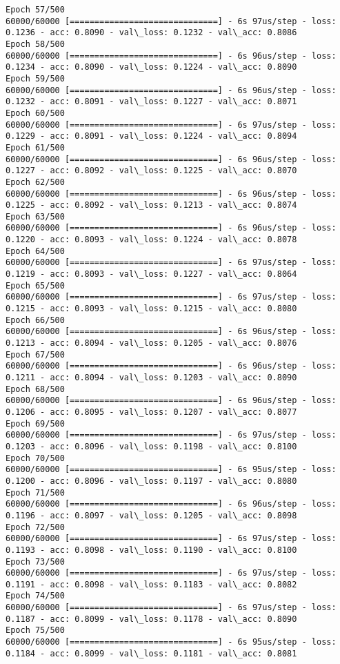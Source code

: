 \documentclass[11pt]{article}
\begin{document}
\begin{Verbatim}[commandchars=\\\{\}]
Epoch 57/500
60000/60000 [==============================] - 6s 97us/step - loss: 0.1236 - acc: 0.8090 - val\_loss: 0.1232 - val\_acc: 0.8086
Epoch 58/500
60000/60000 [==============================] - 6s 96us/step - loss: 0.1234 - acc: 0.8090 - val\_loss: 0.1224 - val\_acc: 0.8090
Epoch 59/500
60000/60000 [==============================] - 6s 96us/step - loss: 0.1232 - acc: 0.8091 - val\_loss: 0.1227 - val\_acc: 0.8071
Epoch 60/500
60000/60000 [==============================] - 6s 97us/step - loss: 0.1229 - acc: 0.8091 - val\_loss: 0.1224 - val\_acc: 0.8094
Epoch 61/500
60000/60000 [==============================] - 6s 96us/step - loss: 0.1227 - acc: 0.8092 - val\_loss: 0.1225 - val\_acc: 0.8070
Epoch 62/500
60000/60000 [==============================] - 6s 96us/step - loss: 0.1225 - acc: 0.8092 - val\_loss: 0.1213 - val\_acc: 0.8074
Epoch 63/500
60000/60000 [==============================] - 6s 96us/step - loss: 0.1220 - acc: 0.8093 - val\_loss: 0.1224 - val\_acc: 0.8078
Epoch 64/500
60000/60000 [==============================] - 6s 97us/step - loss: 0.1219 - acc: 0.8093 - val\_loss: 0.1227 - val\_acc: 0.8064
Epoch 65/500
60000/60000 [==============================] - 6s 97us/step - loss: 0.1215 - acc: 0.8093 - val\_loss: 0.1215 - val\_acc: 0.8080
Epoch 66/500
60000/60000 [==============================] - 6s 96us/step - loss: 0.1213 - acc: 0.8094 - val\_loss: 0.1205 - val\_acc: 0.8076
Epoch 67/500
60000/60000 [==============================] - 6s 96us/step - loss: 0.1211 - acc: 0.8094 - val\_loss: 0.1203 - val\_acc: 0.8090
Epoch 68/500
60000/60000 [==============================] - 6s 96us/step - loss: 0.1206 - acc: 0.8095 - val\_loss: 0.1207 - val\_acc: 0.8077
Epoch 69/500
60000/60000 [==============================] - 6s 97us/step - loss: 0.1203 - acc: 0.8096 - val\_loss: 0.1198 - val\_acc: 0.8100
Epoch 70/500
60000/60000 [==============================] - 6s 95us/step - loss: 0.1200 - acc: 0.8096 - val\_loss: 0.1197 - val\_acc: 0.8080
Epoch 71/500
60000/60000 [==============================] - 6s 96us/step - loss: 0.1196 - acc: 0.8097 - val\_loss: 0.1205 - val\_acc: 0.8098
Epoch 72/500
60000/60000 [==============================] - 6s 97us/step - loss: 0.1193 - acc: 0.8098 - val\_loss: 0.1190 - val\_acc: 0.8100
Epoch 73/500
60000/60000 [==============================] - 6s 97us/step - loss: 0.1191 - acc: 0.8098 - val\_loss: 0.1183 - val\_acc: 0.8082
Epoch 74/500
60000/60000 [==============================] - 6s 97us/step - loss: 0.1187 - acc: 0.8099 - val\_loss: 0.1178 - val\_acc: 0.8090
Epoch 75/500
60000/60000 [==============================] - 6s 95us/step - loss: 0.1184 - acc: 0.8099 - val\_loss: 0.1181 - val\_acc: 0.8081

\end{Verbatim}
\end{document}
